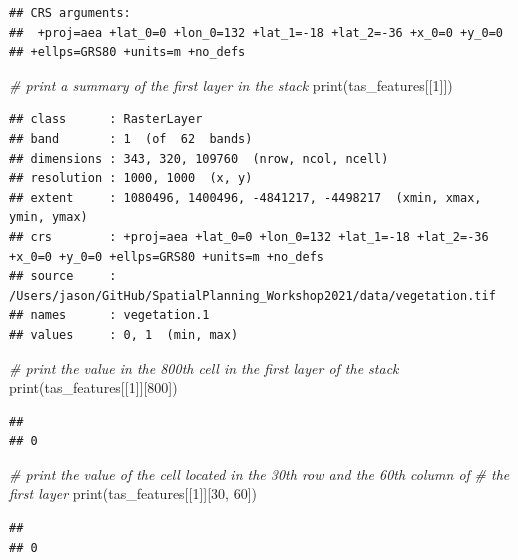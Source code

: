 \documentclass[
  12pt,
]{book}
\newenvironment{Shaded}{\begin{snugshade}}{\end{snugshade}}
\newcommand{\CommentTok}[1]{\textcolor[rgb]{0.56,0.35,0.01}{\textit{#1}}}
\newcommand{\DecValTok}[1]{\textcolor[rgb]{0.00,0.00,0.81}{#1}}
\newcommand{\FunctionTok}[1]{\textcolor[rgb]{0.00,0.00,0.00}{#1}}
\newcommand{\NormalTok}[1]{#1}
\begin{document}
\begin{verbatim}
## CRS arguments:
##  +proj=aea +lat_0=0 +lon_0=132 +lat_1=-18 +lat_2=-36 +x_0=0 +y_0=0
## +ellps=GRS80 +units=m +no_defs
\end{verbatim}

\begin{Shaded}
\begin{Highlighting}[]
\CommentTok{\# print a summary of the first layer in the stack}
\FunctionTok{print}\NormalTok{(tas\_features[[}\DecValTok{1}\NormalTok{]])}
\end{Highlighting}
\end{Shaded}

\begin{verbatim}
## class      : RasterLayer 
## band       : 1  (of  62  bands)
## dimensions : 343, 320, 109760  (nrow, ncol, ncell)
## resolution : 1000, 1000  (x, y)
## extent     : 1080496, 1400496, -4841217, -4498217  (xmin, xmax, ymin, ymax)
## crs        : +proj=aea +lat_0=0 +lon_0=132 +lat_1=-18 +lat_2=-36 +x_0=0 +y_0=0 +ellps=GRS80 +units=m +no_defs 
## source     : /Users/jason/GitHub/SpatialPlanning_Workshop2021/data/vegetation.tif 
## names      : vegetation.1 
## values     : 0, 1  (min, max)
\end{verbatim}

\begin{Shaded}
\begin{Highlighting}[]
\CommentTok{\# print the value in the 800th cell in the first layer of the stack}
\FunctionTok{print}\NormalTok{(tas\_features[[}\DecValTok{1}\NormalTok{]][}\DecValTok{800}\NormalTok{])}
\end{Highlighting}
\end{Shaded}

\begin{verbatim}
##   
## 0
\end{verbatim}

\begin{Shaded}
\begin{Highlighting}[]
\CommentTok{\# print the value of the cell located in the 30th row and the 60th column of}
\CommentTok{\# the first layer}
\FunctionTok{print}\NormalTok{(tas\_features[[}\DecValTok{1}\NormalTok{]][}\DecValTok{30}\NormalTok{, }\DecValTok{60}\NormalTok{])}
\end{Highlighting}
\end{Shaded}

\begin{verbatim}
##   
## 0
\end{verbatim}
\end{document}
